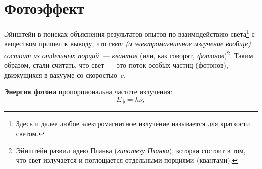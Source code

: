 \documentclass[main.tex]{subfiles}
\begin{document}

\pagestyle{empty}

 

\setcounter{section}{15
}
\addtocounter{section}{-1} 

\section{Фотоэффект}


Эйнштейн в поисках объяснения результатов опытов по взаимодействию света\footnote{Здесь и далее любое электромагнитное излучение называется для краткости светом.} с веществом пришел к выводу, что \emph{свет (и электромагнитное излучение вообще) состоит из отдельных порций~--- квантов} (или, как говорят, \emph{фотонов})\footnote{Эйнштейн развил идею Планка (\emph{гипотезу Планка}), которая состоит в том, что свет излучается и поглощается отдельными порциями (квантами).}. Таким образом, стали считать, что свет~--- это поток особых частиц (фотонов), движущихся в вакууме со скоростью~$c$.

\textbf{Энергия фотона} пропорциональна частоте излучения:
\begin{equation}
    E_\text{ф}=h\nu,
\end{equation}
\end{document}
